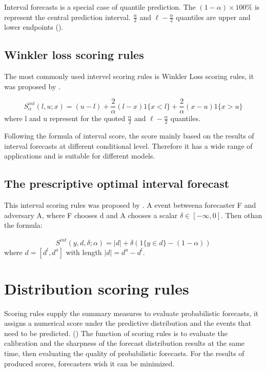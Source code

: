 \documentclass{monashthesis}
\theoremstyle{definition}
\theoremstyle{definition}
\theoremstyle{definition}
\theoremstyle{remark}
\begin{document}
Interval forecasts is a special case of quantile prediction. The
\((1-\alpha)\times100\%\) is represent the central prediction interval.
\(\frac{\alpha}{2}\) and \(\ell-\frac{\alpha}{2}\) quantiles are upper
and lower endpoints (\textcite{GBR07}).

\subsection{Winkler loss scoring
rules}\label{winkler-loss-scoring-rules}

The most commonly used intervel scoring rules is Winkler Loss scoring
rules, it was proposed by \textcite{W72}.

\[
  S_\alpha^{int}(l,u;x)=(u-l)+\frac{2}{\alpha}(l-x)1\{x<l\}+\frac{2}{\alpha}(x-u)1\{x>u\}
\] where l and u represent for the quoted \(\frac{\alpha}{2}\) and
\(\ell-\frac{\alpha}{2}\) quantiles.

Following the formula of interval score, the score mainly based on the
results of interval forecasts at different conditional level. Therefore
it has a wide range of applications and is suitable for different
models.

\subsection{The prescriptive optimal interval
forecast}\label{the-prescriptive-optimal-interval-forecast}

This interval scoring rules was proposed by \textcite{RDSS18}. A event
betweena forecaster F and adversary A, where F chooses d and A chooses a
scalar \(\delta\in[-\infty,0]\). Then othan the formula:

\[
  S^{int}(y,d,\delta;\alpha)=|d|+\delta(1\{y\in{d}\}-(1-\alpha))
\] where \(d=[d^l,d^u]\) with length \(|d|=d^u-d^l\).

\section{Distribution scoring rules}\label{distribution-scoring-rules}

Scoring rules supply the summary measures to evaluate probabilistic
forecasts, it assigns a numerical score under the predictive
distribution and the events that need to be predicted.
(\textcite{GBR07}) The function of scoring rules is to evaluate the
calibration and the sharpness of the forecast distribution results at
the same time, then evaluating the quality of probabilistic forecasts.
For the results of produced scores, forecasters wish it can be
minimized.
\end{document}
